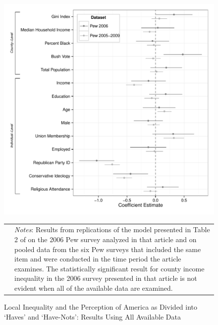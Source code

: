 \begin{figure}[htbp] 
  \caption{Local Inequality and the Perception of America as Divided into `Haves' and `Have-Nots': Results Using All Available Data}
  \label{F:t2_pooled}
  \begin{center}
    \includegraphics[width=5.25in]{../figures/03_examine_all_available_data_t2.pdf}
  \end{center}
  \begin{footnotesize}
  \begin{tabular}{p{.1in} p{5.1in}}
  & \emph{Notes}: Results from replications of the model presented in Table 2 of \citet{Newman2015} on the 2006 Pew survey analyzed in that article and on pooled data from the six Pew surveys that included the same item and were conducted in the time period the article examines.  The statistically significant result for county income inequality in the 2006 survey presented in that article is not evident when all of the available data are examined.
  \end{tabular}
  \end{footnotesize}
\end{figure}

